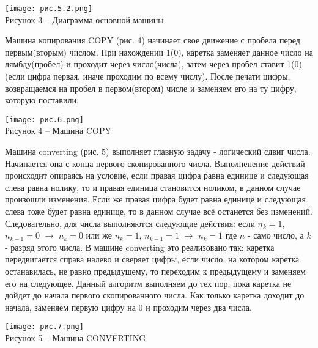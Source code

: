 \documentclass{article}
\begin{document}
\begin{center}
    \texttt{[image: рис.5.2.png]}\\
    \small{Рисунок 3 – Диаграмма основной машины}
    \vspace{0.5cm}
\end{center}

\par Машина копирования COPY (рис. 4) начинает свое движение с пробела перед первым(вторым) числом. При нахождении 1(0), каретка заменяет данное число на лямбду(пробел) и проходит через число(числа), затем через пробел ставит 1(0)(если цифра первая, иначе проходим по всему числу). После печати цифры, возвращаемся на пробел в первом(втором) числе и заменяем его на ту цифру, которую поставили.   

\begin{center}
    \texttt{[image: рис.6.png]}\\
    \small{Рисунок 4 – Машина COPY}
    \vspace{0.5cm}
\end{center}

Машина converting (рис. 5) выполняет главную задачу - логический сдвиг числа. Начинается она с конца первого скопированного числа. Выполненение действий происходит опираясь на условие, если правая цифра равна единице и следующая слева равна нолику, то и правая единица становится ноликом, в данном случае произошли изменения. Если же правая цифра будет равна единице и следующая слева тоже будет равна единице, то в данном случае всё останется без изменений. Следовательно, для числа выполняются следующие действия: если $n_k = 1$, $n_{k-1} = 0$ $\rightarrow$ $n_k = 0$ или же $n_k = 1$, $n_{k-1} = 1$ $\rightarrow$ $n_k = 1$ где $n$ - само число, а $k$ - разряд этого числа. В машине converting это реализовано так: каретка передвигается справа налево и сверяет цифры, если число, на котором каретка останавилась, не равно предыдущему, то переходим к предыдущему и заменяем его на следующее. Данный алгоритм выполняем до тех пор, пока каретка не дойдет до начала первого скопированного числа. Как только каретка доходит до начала, заменяем первую цифру на 0 и проходим через два числа.

\begin{center}
    \texttt{[image: рис.7.png]}\\
    \small{Рисунок 5 – Машина CONVERTING}
    \vspace{0.5cm}
\end{center}
\end{document}
